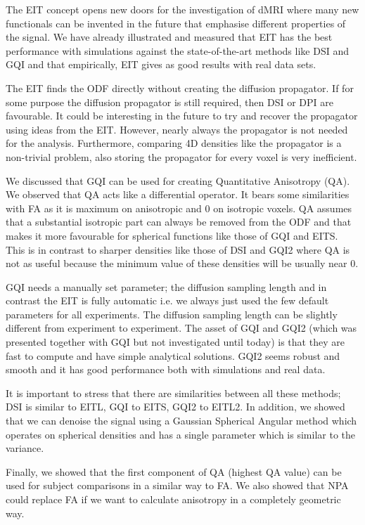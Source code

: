 \documentclass{bioinfo}
\begin{document}
The EIT concept opens new doors for the investigation of dMRI where
many new functionals can be invented in the future that emphasise
different properties of the signal. We have already illustrated and
measured that EIT has the best performance with simulations against
the state-of-the-art methods like DSI and GQI and that empirically,
EIT gives as good results with real data sets.

The EIT finds the ODF directly without creating the diffusion propagator.
If for some purpose the diffusion propagator is still required, then
DSI or DPI \cite{descoteaux2010multiple} are favourable. It could
be interesting in the future to try and recover the propagator using
ideas from the EIT. However, nearly always the propagator is not needed
for the analysis. Furthermore, comparing 4D densities like the propagator
is a non-trivial problem, also storing the propagator for every voxel
is very inefficient.

We discussed that GQI can be used for creating Quantitative Anisotropy
(QA). We observed that QA acts like a differential operator. It bears
some similarities with FA as it is maximum on anisotropic and $0$
on isotropic voxels. QA assumes that a substantial isotropic part
can always be removed from the ODF and that makes it more favourable
for spherical functions like those of GQI and EITS. This is in contrast
to sharper densities like those of DSI and GQI2 where QA is not as
useful because the minimum value of these densities will be usually
near $0$. 

GQI needs a manually set parameter; the diffusion sampling length
and in contrast the EIT is fully automatic i.e. we always just used
the few default parameters for all experiments. The diffusion sampling
length can be slightly different from experiment to experiment. The
asset of GQI and GQI2 (which was presented together with GQI but not
investigated until today) is that they are fast to compute and have
simple analytical solutions. GQI2 seems robust and smooth and it has
good performance both with simulations and real data. 

It is important to stress that there are similarities between all
these methods; DSI is similar to EITL, GQI to EITS, GQI2 to EITL2.
In addition, we showed that we can denoise the signal using a Gaussian
Spherical Angular method which operates on spherical densities and
has a single parameter which is similar to the variance.

Finally, we showed that the first component of QA (highest QA value)
can be used for subject comparisons in a similar way to FA. We also
showed that NPA could replace FA if we want to calculate anisotropy
in a completely geometric way. 
\end{document}
